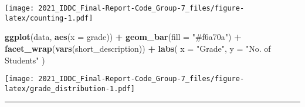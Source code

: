 \documentclass[
]{article}
\newenvironment{Shaded}{\begin{snugshade}}{\end{snugshade}}
\newcommand{\DataTypeTok}[1]{\textcolor[rgb]{0.13,0.29,0.53}{#1}}
\newcommand{\KeywordTok}[1]{\textcolor[rgb]{0.13,0.29,0.53}{\textbf{#1}}}
\newcommand{\NormalTok}[1]{#1}
\newcommand{\OperatorTok}[1]{\textcolor[rgb]{0.81,0.36,0.00}{\textbf{#1}}}
\newcommand{\StringTok}[1]{\textcolor[rgb]{0.31,0.60,0.02}{#1}}
\begin{document}
\begin{Shaded}
\end{Shaded}

\texttt{[image: 2021\_IDDC\_Final-Report-Code\_Group-7\_files/figure-latex/counting-1.pdf]}

\begin{Shaded}
\begin{Highlighting}[]
\KeywordTok{ggplot}\NormalTok{(data, }\KeywordTok{aes}\NormalTok{(}\DataTypeTok{x =}\NormalTok{ grade)) }\OperatorTok{+}
\StringTok{  }\KeywordTok{geom_bar}\NormalTok{(}\DataTypeTok{fill =} \StringTok{"#f6a70a"}\NormalTok{) }\OperatorTok{+}
\StringTok{  }\KeywordTok{facet_wrap}\NormalTok{(}\KeywordTok{vars}\NormalTok{(short_description)) }\OperatorTok{+}
\StringTok{  }\KeywordTok{labs}\NormalTok{(}
    \DataTypeTok{x =} \StringTok{"Grade"}\NormalTok{,}
    \DataTypeTok{y =} \StringTok{"No. of Students"}
\NormalTok{  )}
\end{Highlighting}
\end{Shaded}

\texttt{[image: 2021\_IDDC\_Final-Report-Code\_Group-7\_files/figure-latex/grade\_distribution-1.pdf]}

\begin{center}\rule{0.5\linewidth}{0.5pt}\end{center}
\end{document}
